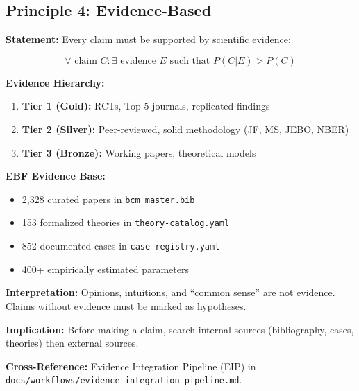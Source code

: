 \subsection{Principle 4: Evidence-Based}

\begin{tcolorbox}[colback=gray!5!white, colframe=gray!75!black,
    title=Axiom UNMAPPED_PR-4: Evidence Primacy]

\textbf{Statement:} Every claim must be supported by scientific evidence:

\begin{equation}
\forall \text{ claim } C: \exists \text{ evidence } E \text{ such that } P(C | E) > P(C)
\end{equation}

\textbf{Evidence Hierarchy:}
\begin{enumerate}
    \item \textbf{Tier 1 (Gold):} RCTs, Top-5 journals, replicated findings
    \item \textbf{Tier 2 (Silver):} Peer-reviewed, solid methodology (JF, MS, JEBO, NBER)
    \item \textbf{Tier 3 (Bronze):} Working papers, theoretical models
\end{enumerate}

\textbf{EBF Evidence Base:}
\begin{itemize}[nosep]
    \item 2,328 curated papers in \texttt{bcm\_master.bib}
    \item 153 formalized theories in \texttt{theory-catalog.yaml}
    \item 852 documented cases in \texttt{case-registry.yaml}
    \item 400+ empirically estimated parameters
\end{itemize}

\textbf{Interpretation:} Opinions, intuitions, and ``common sense'' are not evidence. Claims without evidence must be marked as hypotheses.

\textbf{Implication:} Before making a claim, search internal sources (bibliography, cases, theories) then external sources.

\textbf{Cross-Reference:} Evidence Integration Pipeline (EIP) in \texttt{docs/workflows/evidence-integration-pipeline.md}.

\end{tcolorbox}


